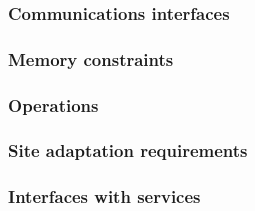 \subsubsection{Communications interfaces}


\subsubsection{Memory constraints}


\subsubsection{Operations}


\subsubsection{Site adaptation requirements}

\subsubsection{Interfaces with services}

